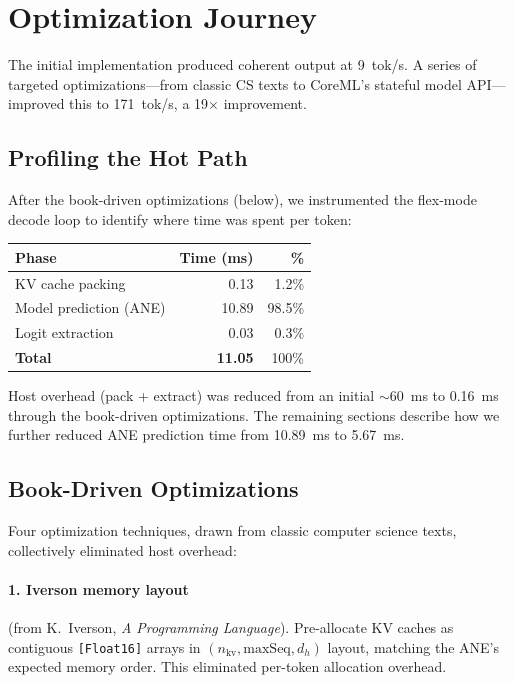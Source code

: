 \documentclass[11pt,twocolumn]{article}
\begin{document}
\section{Optimization Journey}
\label{sec:opt}

The initial implementation produced coherent output at 9~tok/s. A
series of targeted optimizations---from classic CS texts to CoreML's
stateful model API---improved this to 171~tok/s, a 19$\times$
improvement.

\subsection{Profiling the Hot Path}

After the book-driven optimizations (below), we instrumented the
flex-mode decode loop to identify where time was spent per token:

\begin{center}
\footnotesize
\begin{tabular}{lrr}
\toprule
\textbf{Phase} & \textbf{Time (ms)} & \textbf{\%} \\
\midrule
KV cache packing & 0.13 & 1.2\% \\
Model prediction (ANE) & 10.89 & 98.5\% \\
Logit extraction & 0.03 & 0.3\% \\
\midrule
\textbf{Total} & \textbf{11.05} & 100\% \\
\bottomrule
\end{tabular}
\end{center}

Host overhead (pack + extract) was reduced from an initial
$\sim$60~ms to 0.16~ms through the book-driven optimizations.
The remaining sections describe how we further reduced ANE
prediction time from 10.89~ms to 5.67~ms.

\subsection{Book-Driven Optimizations}

Four optimization techniques, drawn from classic computer science
texts, collectively eliminated host overhead:

\paragraph{1. Iverson memory layout} (from K.~Iverson, \textit{A
Programming Language}). Pre-allocate KV caches as contiguous
\texttt{[Float16]} arrays in $(n_\text{kv}, \text{maxSeq}, d_h)$
layout, matching the ANE's expected memory order. This eliminated
per-token allocation overhead.
\end{document}
